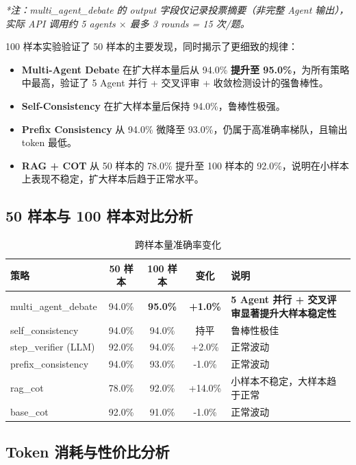 \documentclass[lang=cn,a4paper,newtx]{elegantpaper}
\begin{document}
\textit{*注：multi\_agent\_debate 的 output 字段仅记录投票摘要（非完整 Agent 输出），实际 API 调用约 5 agents $\times$ 最多 3 rounds = 15 次/题。}

100 样本实验验证了 50 样本的主要发现，同时揭示了更细致的规律：

\begin{itemize}
  \item \textbf{Multi-Agent Debate} 在扩大样本量后从 94.0\% \textbf{提升至 95.0\%}，为所有策略中最高，验证了 5 Agent 并行 + 交叉评审 + 收敛检测设计的强鲁棒性。
  \item \textbf{Self-Consistency} 在扩大样本量后保持 94.0\%，鲁棒性极强。
  \item \textbf{Prefix Consistency} 从 94.0\% 微降至 93.0\%，仍属于高准确率梯队，且输出 token 最低。
  \item \textbf{RAG + COT} 从 50 样本的 78.0\% 提升至 100 样本的 92.0\%，说明在小样本上表现不稳定，扩大样本后趋于正常水平。
\end{itemize}

\subsection{50 样本与 100 样本对比分析}

\begin{table}[htbp]
\centering
\caption{跨样本量准确率变化}
\begin{tabular}{lcccp{4cm}}
\toprule
策略 & 50 样本 & 100 样本 & 变化 & 说明 \\
\midrule
multi\_agent\_debate & 94.0\% & \textbf{95.0\%} & \textbf{+1.0\%} & \textbf{5 Agent 并行 + 交叉评审显著提升大样本稳定性} \\
self\_consistency & 94.0\% & 94.0\% & 持平 & 鲁棒性极佳 \\
step\_verifier (LLM) & 92.0\% & 94.0\% & +2.0\% & 正常波动 \\
prefix\_consistency & 94.0\% & 93.0\% & -1.0\% & 正常波动 \\
rag\_cot & 78.0\% & 92.0\% & +14.0\% & 小样本不稳定，大样本趋于正常 \\
base\_cot & 92.0\% & 91.0\% & -1.0\% & 正常波动 \\
\bottomrule
\end{tabular}
\end{table}

\subsection{Token 消耗与性价比分析}
\end{document}
